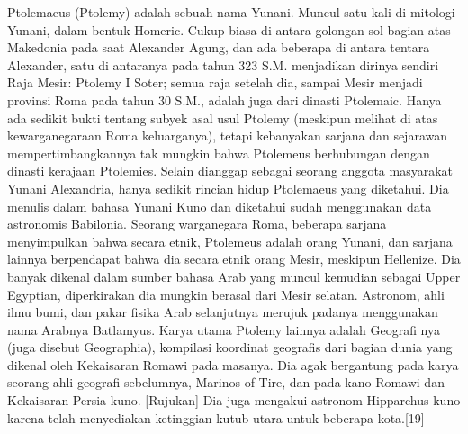     Ptolemaeus (Ptolemy) adalah sebuah nama Yunani. Muncul satu kali di mitologi Yunani, dalam bentuk Homeric. Cukup biasa di antara golongan sol bagian atas Makedonia pada saat Alexander Agung, dan ada beberapa di antara tentara Alexander, satu di antaranya pada tahun 323 S.M. menjadikan dirinya sendiri Raja Mesir: Ptolemy I Soter; semua raja setelah dia, sampai Mesir menjadi provinsi Roma pada tahun 30 S.M., adalah juga dari dinasti Ptolemaic. Hanya ada sedikit bukti tentang subyek asal usul Ptolemy (meskipun melihat di atas kewarganegaraan Roma keluarganya), tetapi kebanyakan sarjana dan sejarawan mempertimbangkannya tak mungkin bahwa Ptolemeus berhubungan dengan dinasti kerajaan Ptolemies.
    Selain dianggap sebagai seorang anggota masyarakat Yunani Alexandria, hanya sedikit rincian hidup Ptolemaeus yang diketahui. Dia menulis dalam bahasa Yunani Kuno dan diketahui sudah menggunakan data astronomis Babilonia. Seorang warganegara Roma, beberapa sarjana menyimpulkan bahwa secara etnik, Ptolemeus adalah orang Yunani, dan sarjana lainnya berpendapat bahwa dia secara etnik orang Mesir, meskipun Hellenize. Dia banyak dikenal dalam sumber bahasa Arab yang muncul kemudian sebagai Upper Egyptian, diperkirakan dia mungkin berasal dari Mesir selatan. Astronom, ahli ilmu bumi, dan pakar fisika Arab selanjutnya merujuk padanya menggunakan nama Arabnya Batlamyus.
    Karya utama Ptolemy lainnya adalah Geografi nya (juga disebut Geographia), kompilasi koordinat geografis dari bagian dunia yang dikenal oleh Kekaisaran Romawi pada masanya. Dia agak bergantung pada karya seorang ahli geografi sebelumnya, Marinos of Tire, dan pada kano Romawi dan Kekaisaran Persia kuno. [Rujukan] Dia juga mengakui astronom Hipparchus kuno karena telah menyediakan ketinggian kutub utara untuk beberapa kota.[19]
  
